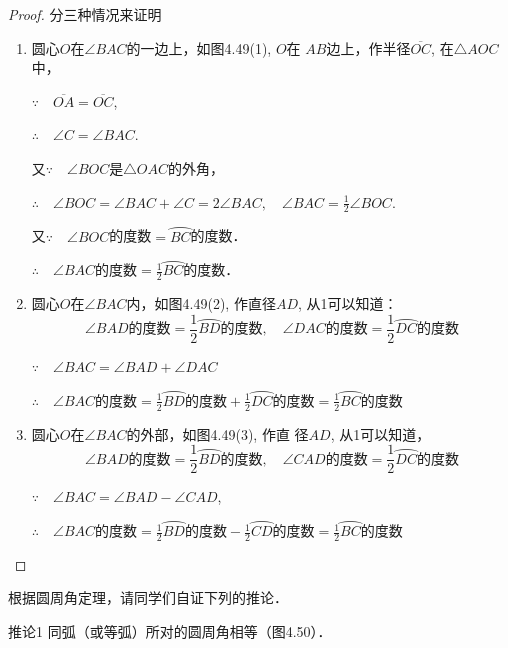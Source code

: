 \begin{proof}
分三种情况来证明
\begin{enumerate}
\item 圆心$O$在$\angle BAC$的一边上，如图4.49(1), $O$在
$AB$边上，作半径$\overline{OC}$, 在$\triangle AOC$中，

$\because \quad \overline{OA}=\overline{OC}$,

$\therefore\quad \angle C=\angle BAC$.

又$\because\quad \angle BOC$是$\triangle OAC$的外角，

$\therefore\quad \angle BOC=\angle BAC+\angle C=2\angle BAC,\quad \angle BAC=\frac{1}{2}\angle BOC$.

又$\because\quad \angle BOC$的度数$=\wideparen{BC}$的度数．

$\therefore\quad \angle BAC$的度数$=\frac{1}{2}\wideparen{BC}$的度数．

\item 圆心$O$在$\angle BAC$内，如图4.49(2), 
作直径$AD$, 从1可以知道：
\[\angle BAD\text{的度数}=\frac{1}{2}\wideparen{BD}\text{的度数},\quad \angle DAC\text{的度数}=\frac{1}{2}\wideparen{DC}\text{的度数}\]

$\because\quad \angle BAC=\angle BAD+\angle DAC$

$\therefore\quad \angle BAC\text{的度数}=\frac{1}{2}\wideparen{BD}\text{的度数}+\frac{1}{2}\wideparen{DC}\text{的度数}=\frac{1}{2}\wideparen{BC}\text{的度数}$

\item 圆心$O$在$\angle BAC$的外部，如图4.49(3), 作直
径$AD$, 从1可以知道，
\[\angle BAD\text{的度数}=\frac{1}{2}\wideparen{BD}\text{的度数},\quad \angle CAD\text{的度数}=\frac{1}{2}\wideparen{DC}\text{的度数}\]

$\because\quad \angle BAC=\angle BAD-\angle CAD$,

$\therefore\quad \angle BAC\text{的度数}=\frac{1}{2}\wideparen{BD}\text{的度数}-\frac{1}{2}\wideparen{CD}\text{的度数}=\frac{1}{2}\wideparen{BC}\text{的度数}$
\end{enumerate}
\end{proof}

根据圆周角定理，请同学们自证下列的推论．

\begin{blk}{推论1} 
同弧（或等弧）所对的圆周角相等（图4.50）．
\end{blk}

